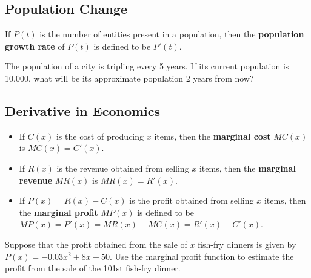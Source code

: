 \hypertarget{population-change}{%
\subsection{Population Change}\label{population-change}}

\begin{definition}

If \(P(t)\) is the number of entities present in a population, then the
\textbf{population growth rate} of \(P(t)\) is defined to be \(P'(t)\).

\end{definition}

\begin{example}

The population of a city is tripling every 5 years. If its current
population is 10,000, what will be its approximate population 2 years
from now?

\end{example}
\vspace*{6\baselineskip}

\hypertarget{derivative-in-economics}{%
\subsection{Derivative in Economics}\label{derivative-in-economics}}

\begin{itemize}
\item
  If \(C(x)\) is the cost of producing \(x\) items, then the
  \textbf{marginal cost} \(MC(x)\) is \(MC(x)=C'(x)\).
\item
  If \(R(x)\) is the revenue obtained from selling \(x\) items, then the
  \textbf{marginal revenue} \(MR(x)\) is \(MR(x)=R'(x)\).
\item
  If \(P(x)=R(x)-C(x)\) is the profit obtained from selling \(x\) items,
  then the \textbf{marginal profit} \(MP(x)\) is defined to be
  \(MP(x)=P'(x)=MR(x)-MC(x)=R'(x)-C'(x)\).
\end{itemize}


\begin{example}

Suppose that the profit obtained from the sale of \(x\) fish-fry dinners is given by \(P(x)=-0.03x^2+8x-50\). Use the marginal profit function to estimate the profit from the sale of the 101st fish-fry dinner.

\end{example}
\vspace*{6\baselineskip}

